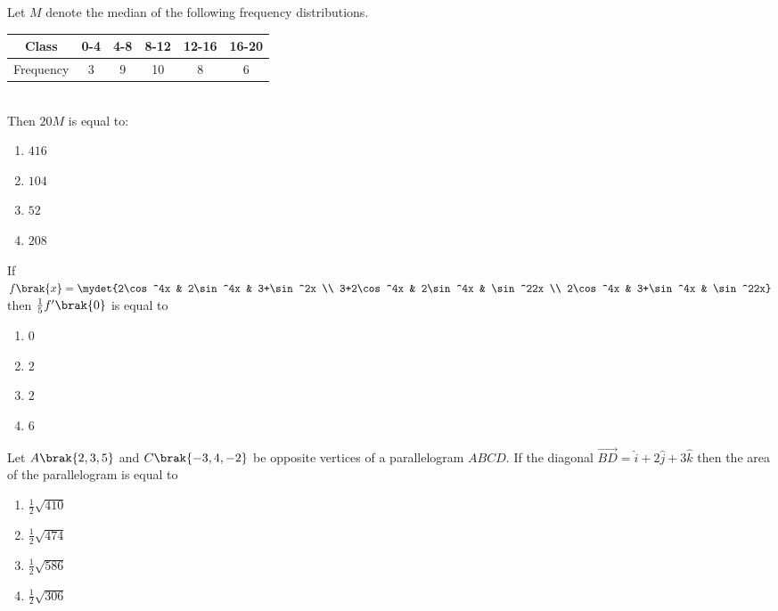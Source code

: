 \iffalse
\title{JEE 2024}
\author{ee24btech11018}
\section{mcq-single}
\fi
\item Let $M$ denote the median of the following frequency distributions.\\
	\begin{table}[h!]
		\centering
	\begin{tabular}{|c|c|c|c|c|c|}
\hline
Class & 0-4 & 4-8 & 8-12 & 12-16 & 16-20 \\ 
\hline
Frequency & 3 & 9 & 10 & 8 & 6 \\
\hline
\end{tabular}	
	\end{table}\\
		Then $20 M$ is equal to: \hfill {} 
		\begin{enumerate}
	\item $416$
	\item $104$
	\item $52$
	\item $208$
		\end{enumerate}
	\item If $f\brak{x} = \mydet{2\cos^4x & 2\sin^4x & 3+\sin^2x \\ 3+2\cos^4x & 2\sin^4x & \sin^22x \\ 2\cos^4x & 3+\sin^4x & \sin^22x}$ then $\frac{1}{5}f^{\prime}\brak{0}$ is equal to  \hfill {} 
		\begin{enumerate}
			\item $0$
			\item $2$
			\item $2$
			\item $6$
		\end{enumerate}
	\item Let $A\brak{2, 3, 5}$ and $C\brak{-3, 4, -2}$ be opposite vertices of a parallelogram $ABCD$. If the diagonal $\overrightarrow{BD} = \hat{i}+2\hat{j}+3\hat{k}$ then the area of the parallelogram is equal to \hfill {} 
		\begin{enumerate}
			\item $\frac{1}{2}\sqrt{410}$
			\item $\frac{1}{2}\sqrt{474}$
			\item $\frac{1}{2}\sqrt{586}$
			\item $\frac{1}{2}\sqrt{306}$
		\end{enumerate}
